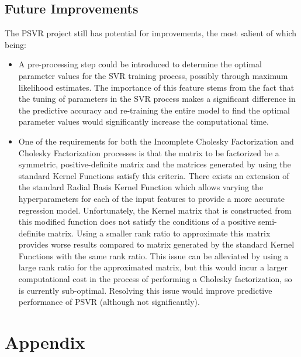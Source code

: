 \documentclass[12pt]{article}
\newcounter{reportpage}
\begin{document}
\subsection{Future Improvements}
The PSVR project still has potential for improvements, the most salient of which being:
\begin{itemize}
\item A pre-processing step could be introduced to determine the optimal parameter values for the SVR training process, possibly through maximum likelihood estimates. The importance of this feature stems from the fact that the tuning of parameters in the SVR process makes a significant difference in the predictive accuracy and re-training the entire model to find the optimal parameter values would significantly increase the computational time.
\item One of the requirements for both the Incomplete Cholesky Factorization and Cholesky Factorization processes is that the matrix to be factorized be a symmetric, positive-definite matrix and the matrices generated by using the standard Kernel Functions satisfy this criteria. There exists an extension of the standard Radial Basis Kernel Function which allows varying the hyperparameters for each of the input features to provide a more accurate regression model. Unfortunately, the Kernel matrix that is constructed from this modified function does not satisfy the conditions of a positive semi-definite matrix. Using a smaller rank ratio to approximate this matrix provides worse results compared to matrix generated by the standard Kernel Functions with the same rank ratio. This issue can be alleviated by using a large rank ratio for the approximated matrix, but this would incur a larger computational cost in the process of performing a Cholesky factorization, so is currently sub-optimal. Resolving this issue would improve predictive performance of PSVR (although not significantly).
\end{itemize}
\cleardoublepage
{}
\setcounter{page}{\value{reportpage}}
\section{Appendix}
\end{document}

